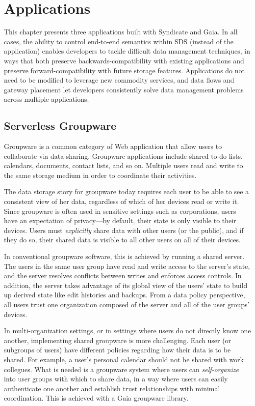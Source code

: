\chapter{Applications}
\label{chap:applications}

This chapter presents three applications built with Syndicate and Gaia.
In all cases, the ability to control end-to-end semantics within SDS
(instead of the application) enables
developers to tackle difficult data management
techniques, in ways that both preserve backwards-compatibility with existing
applications and preserve forward-compatibility with future storage features.
Applications do not need to be modified to leverage
new commodity services, and data flows and gateway placement let developers
consistently solve data management problems across multiple applications.

\section{Serverless Groupware}

Groupware is a common category of Web application that allow users to
collaborate via data-sharing.  Groupware applications include shared to-do lists, calendars,
documents, contact lists, and so on.  Multiple users read and write to the same
storage medium in order to coordinate their activities.

The data storage story for groupware today requires each user to be able to see
a consistent view of her data, regardless of which of her devices read or write
it.  Since groupware is often used in sensitive
settings such as corporations, users have an expectation of privacy---by
default, their state is only visible to their devices.  Users must
\emph{explicitly} share data with other users (or the public), and if they do
so, their shared data is visible to all other users on all of their devices.

In conventional groupware software, this is achieved by running a shared server.
The users in the same user group have read and write access to the server's
state, and the server resolves conflicts between writes and enforces access
controls.  In addition, the server takes advantage of its global view of the
users' state to build up derived state like edit histories and
backups.  From a data policy perspective, all users trust one
organization composed of the server and all of the user groups'
devices.

In multi-organization settings, or in settings where users do not directly know
one another, implementing shared groupware is more challenging.  Each user (or
subgroups of users) have different policies regarding how their data is to be shared.
For example, a user's personal calendar should not be shared with work
collegues.  What is needed is a groupware system where users can \emph{self-organize} into
user groups with which to share data, in a way where users can easily
authenticate one another and establish trust relationships with minimal
coordination.  This is achieved with a Gaia groupware library.

